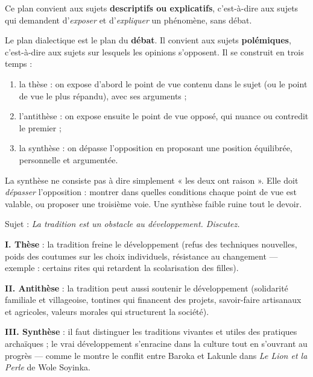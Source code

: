 \documentclass[11pt]{article}
\newcommand{\cle}[1]{{\popxbold\color{popdark}#1}}
\newcounter{popsec}
\newcounter{popsub}
\newcommand{\courssub}[1]{%
  \stepcounter{popsub}%
  \par\vspace{9pt}\noindent{\popxbold\fontsize{11.5}{13}\selectfont\color{popink}{\color{poporange}\thepopsec.\thepopsub}\hspace{6pt}#1}\par\nopagebreak\vspace{4pt}
}
\begin{document}
Ce plan convient aux sujets \textbf{descriptifs ou explicatifs}, c'est-à-dire aux sujets qui demandent d'\emph{exposer} et d'\emph{expliquer} un phénomène, sans débat.

\courssub{Le plan dialectique}

Le \cle{plan dialectique} est le plan du \textbf{débat}. Il convient aux sujets \textbf{polémiques}, c'est-à-dire aux sujets sur lesquels les opinions s'opposent. Il se construit en trois temps :

\begin{enumerate}
\item la \cle{thèse} : on expose d'abord le point de vue contenu dans le sujet (ou le point de vue le plus répandu), avec ses arguments ;
\item l'\cle{antithèse} : on expose ensuite le point de vue opposé, qui nuance ou contredit le premier ;
\item la \cle{synthèse} : on dépasse l'opposition en proposant une position équilibrée, personnelle et argumentée.
\end{enumerate}

\begin{attention}
La synthèse ne consiste pas à dire simplement « les deux ont raison ». Elle doit \emph{dépasser} l'opposition : montrer dans quelles conditions chaque point de vue est valable, ou proposer une troisième voie. Une synthèse faible ruine tout le devoir.
\end{attention}

\begin{exemplebox}
Sujet : \emph{La tradition est un obstacle au développement. Discutez.}

\textbf{I. Thèse} : la tradition freine le développement (refus des techniques nouvelles, poids des coutumes sur les choix individuels, résistance au changement — exemple : certains rites qui retardent la scolarisation des filles).

\textbf{II. Antithèse} : la tradition peut aussi soutenir le développement (solidarité familiale et villageoise, tontines qui financent des projets, savoir-faire artisanaux et agricoles, valeurs morales qui structurent la société).

\textbf{III. Synthèse} : il faut distinguer les traditions vivantes et utiles des pratiques archaïques ; le vrai développement s'enracine dans la culture tout en s'ouvrant au progrès — comme le montre le conflit entre Baroka et Lakunle dans \emph{Le Lion et la Perle} de Wole Soyinka.
\end{exemplebox}
\end{document}
